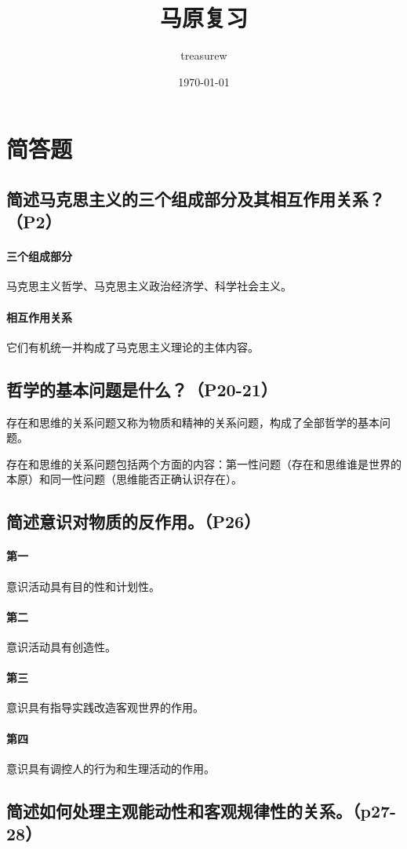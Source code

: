 \documentclass[UTF8]{ctexart}
\title{马原复习}
\author{treasurew}
\date{\today}
\begin{document}
	\tableofcontents
	\maketitle
	\section{简答题}
		\subsection{简述马克思主义的三个组成部分及其相互作用关系？（P2）}
			\paragraph{三个组成部分}
				马克思主义哲学、马克思主义政治经济学、科学社会主义。
			\paragraph{相互作用关系}
				它们有机统一并构成了马克思主义理论的主体内容。
		\subsection{哲学的基本问题是什么？（P20-21）}
			存在和思维的关系问题又称为物质和精神的关系问题，构成了全部哲学的基本问题。\par
			存在和思维的关系问题包括两个方面的内容：第一性问题（存在和思维谁是世界的本原）和同一性问题（思维能否正确认识存在）。
		\subsection{简述意识对物质的反作用。（P26）}
			\paragraph{第一}
				意识活动具有目的性和计划性。
			\paragraph{第二}
				意识活动具有创造性。
			\paragraph{第三}
				意识具有指导实践改造客观世界的作用。
			\paragraph{第四}
				意识具有调控人的行为和生理活动的作用。
		\subsection{简述如何处理主观能动性和客观规律性的关系。（p27-28）}
\end{document}
